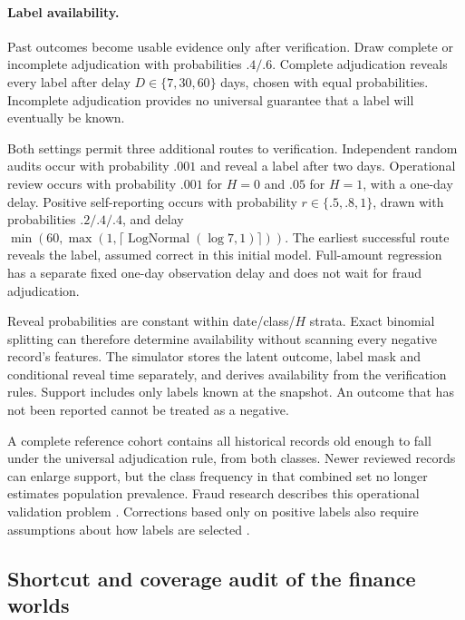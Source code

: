 \documentclass[11pt]{article}
\begin{document}
\paragraph{Label availability.} Past outcomes become usable evidence only after verification. Draw complete or incomplete adjudication with probabilities $.4/.6$. Complete adjudication reveals every label after delay $D\in\{7,30,60\}$ days, chosen with equal probabilities. Incomplete adjudication provides no universal guarantee that a label will eventually be known.

Both settings permit three additional routes to verification. Independent random audits occur with probability $.001$ and reveal a label after two days. Operational review occurs with probability $.001$ for $H=0$ and $.05$ for $H=1$, with a one-day delay. Positive self-reporting occurs with probability $r\in\{.5,.8,1\}$, drawn with probabilities $.2/.4/.4$, and delay $\min(60,\max(1,\lceil\operatorname{LogNormal}(\log7,1)\rceil))$. The earliest successful route reveals the label, assumed correct in this initial model. Full-amount regression has a separate fixed one-day observation delay and does not wait for fraud adjudication.

Reveal probabilities are constant within date/class/$H$ strata. Exact binomial splitting can therefore determine availability without scanning every negative record's features. The simulator stores the latent outcome, label mask and conditional reveal time separately, and derives availability from the verification rules. Support includes only labels known at the snapshot. An outcome that has not been reported cannot be treated as a negative.

A complete reference cohort contains all historical records old enough to fall under the universal adjudication rule, from both classes. Newer reviewed records can enlarge support, but the class frequency in that combined set no longer estimates population prevalence. Fraud research describes this operational validation problem \cite{fraud-realistic,fraud-handbook}. Corrections based only on positive labels also require assumptions about how labels are selected \cite{elkan-pu}.


\subsection{Shortcut and coverage audit of the finance worlds}
\label{sec:finance-shortcut}
\end{document}
